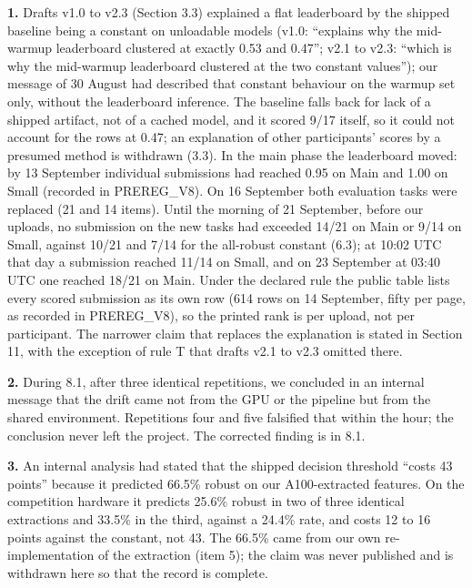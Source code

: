 \noindent\textbf{1.} Drafts v1.0 to v2.3 (Section 3.3) explained a flat leaderboard by the shipped baseline being a constant on unloadable models (v1.0: ``explains why the mid-warmup leaderboard clustered at exactly 0.53 and 0.47''; v2.1 to v2.3: ``which is why the mid-warmup leaderboard clustered at the two constant values''); our message of 30 August had described that constant behaviour on the warmup set only, without the leaderboard inference. The baseline falls back for lack of a shipped artifact, not of a cached model, and it scored 9/17 itself, so it could not account for the rows at 0.47; an explanation of other participants' scores by a presumed method is withdrawn (3.3). In the main phase the leaderboard moved: by 13 September individual submissions had reached 0.95 on Main and 1.00 on Small (recorded in PREREG\_V8). On 16 September both evaluation tasks were replaced (21 and 14 items). Until the morning of 21 September, before our uploads, no submission on the new tasks had exceeded 14/21 on Main or 9/14 on Small, against 10/21 and 7/14 for the all-robust constant (6.3); at 10:02 UTC that day a submission reached 11/14 on Small, and on 23 September at 03:40 UTC one reached 18/21 on Main. Under the declared rule the public table lists every scored submission as its own row (614 rows on 14 September, fifty per page, as recorded in PREREG\_V8), so the printed rank is per upload, not per participant. The narrower claim that replaces the explanation is stated in Section 11, with the exception of rule T that drafts v2.1 to v2.3 omitted there.
\par

\noindent\textbf{2.} During 8.1, after three identical repetitions, we concluded in an internal message that the drift came not from the GPU or the pipeline but from the shared environment. Repetitions four and five falsified that within the hour; the conclusion never left the project. The corrected finding is in 8.1.
\par

\noindent\textbf{3.} An internal analysis had stated that the shipped decision threshold ``costs 43 points'' because it predicted 66.5\% robust on our A100-extracted features. On the competition hardware it predicts 25.6\% robust in two of three identical extractions and 33.5\% in the third, against a 24.4\% rate, and costs 12 to 16 points against the constant, not 43. The 66.5\% came from our own re-implementation of the extraction (item 5); the claim was never published and is withdrawn here so that the record is complete.
\par

